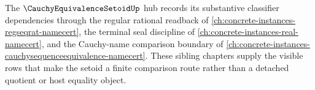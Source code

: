 The $\CauchyEquivalenceSetoidUp$ hub records its substantive classifier dependencies through the regular rational readback of \autoref{ch:concrete-instances-regseqrat-namecert}, the terminal seal discipline of \autoref{ch:concrete-instances-real-namecert}, and the Cauchy-name comparison boundary of \autoref{ch:concrete-instances-cauchysequenceequivalence-namecert}. These sibling chapters supply the visible rows that make the setoid a finite comparison route rather than a detached quotient or host equality object.
